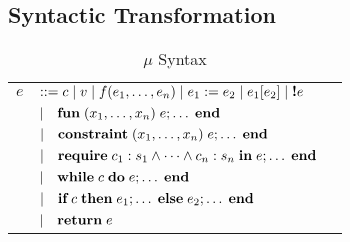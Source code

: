 \subsection{Syntactic Transformation}
\label{sec:syntactic-transformation}

\begin{table}
\begin{center}
\begin{tabular}{lll}
$e$ & $::= c\; |\;  v\;  |\;  f(e_1, \dots,e_n)\;|\;e_1 := e_2\;|\;e_1[e_2]\;|\;\text{\bf !}e$\\
& $|\quad  \text{\bf fun}\;(x_1,\dots,x_n)\;  e;\dots\; \text{\bf end}$\\
& $|\quad  \text{\bf constraint}\;(x_1,\dots,x_n)\;  e;\dots\; \text{\bf end}$\\
& $| \quad\text{\bf require}\; c_1:s_1\wedge\dots\wedge c_n:s_n\;\text{\bf in}\; e;\dots\;\text{\bf end}$\\
& $| \quad\text{\bf while}\; c\;\text{\bf do}\; e;\dots\;\text{\bf end}$\\
& $| \quad\text{\bf if}\; c\;\text{\bf then}\; e_1;\dots\;\text{\bf else}\; e_2;\dots\;\text{\bf end}$\\
& $|\quad  \text{\bf return} \;e$
\end{tabular}
\end{center}
\caption{$\mu$\turtle{} Syntax}
\label{tab:mu-turtle}
\end{table}


